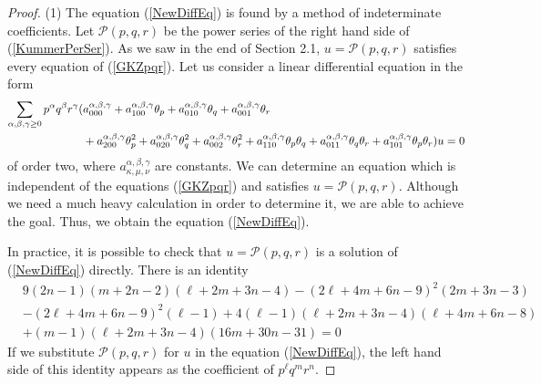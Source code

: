 \documentclass[10pt]{article}
\begin{document}
\begin{proof}
(1) The equation (\ref{NewDiffEq}) is found by a method of indeterminate coefficients.
Let $\mathcal{P}(p,q,r)$ be the power series of the right hand side of  (\ref{KummerPerSer}). 
As we saw in the end of Section 2.1,
$u=\mathcal{P}(p,q,r)$ satisfies every equation of (\ref{GKZpqr}).
Let us consider a linear differential equation in the form
\begin{align*}
\sum_{\alpha,\beta,\gamma \geq 0} p^\alpha q^\beta r^\gamma (&a_{000}^{\alpha,\beta,\gamma} + a_{100}^{\alpha,\beta,\gamma} \theta_p  + a_{010}^{\alpha,\beta,\gamma} \theta_q + a_{001}^{\alpha,\beta,\gamma} \theta_r  \notag\\
&+a_{200}^{\alpha,\beta,\gamma}  \theta_{p}^2  
+a_{020}^{\alpha,\beta,\gamma} \theta_q^2 +a_{002}^{\alpha,\beta,\gamma} \theta_r^2 
+a_{110}^{\alpha,\beta,\gamma} \theta_p \theta_q +a_{011}^{\alpha,\beta,\gamma} \theta_q \theta_r +a_{101}^{\alpha,\beta,\gamma} \theta_p \theta_r) u =0
\end{align*}
of order two,
where $a_{\kappa,\mu,\nu}^{\alpha,\beta,\gamma}$ are constants.
We can determine an equation which is independent of the equations (\ref{GKZpqr}) and satisfies $u=\mathcal{P}(p,q,r)$.
Although we need a much heavy calculation in order to determine it, we are able to achieve the goal.
Thus, we obtain the equation (\ref{NewDiffEq}).

In practice,
it is possible to check that  $u=\mathcal{P}(p,q,r)$ is a solution of (\ref{NewDiffEq}) directly.
There is an identity
\begin{align*}
&9(2n-1)(m+2n-2)(\ell +2m +3n -4) 
- (2\ell +4m +6n -9)^2 (2m+3n-3)\\
&- (2\ell +4m +6n -9)^2 (\ell-1)
+4 (\ell-1)(\ell + 2m + 3n -4) (\ell +4m +6n -8)\\
&+(m-1) (\ell +2 m +3n -4) (16m+30n -31) =0
\end{align*}
If we substitute $\mathcal{P}(p,q,r)$ for $u$ in the equation (\ref{NewDiffEq}), 
the left hand side of this identity appears as the coefficient of $p^\ell q^m r^n$.



\end{proof}
\end{document}
